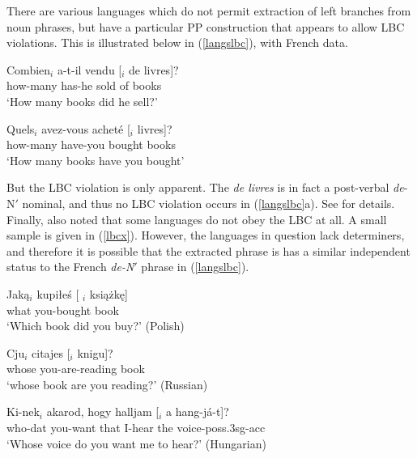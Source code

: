 \documentclass[output=paper
                ,modfonts
                ,nonflat
	        ,collection
	        ,collectionchapter
	        ,collectiontoclongg
 	        ,biblatex
                ,babelshorthands
                ,newtxmath
                ,draftmode
                ,colorlinks, citecolor=brown
]{./langsci/langscibook}
\begin{document}
There are various  languages  which do not permit extraction of left branches from noun phrases, 
but have a particular PP construction that appears to allow LBC violations.
This is illustrated below in (\ref{langslbc}), with French data. 

\eal
\ex \gll Combien$_i$  a-t-il  vendu  [\spc$_i$  de  livres]?\\
how-many  has-he  sold {} of  books\\
\glt `How many books did he sell?'

\ex \gll Quels$_i$  avez-vous  achet\'{e}  [\spc$_i$  livres]?\\
how-many  have-you  bought {}  books\\
\glt `How many books have you bought' 


 \zl \label{langslbc}


\noindent
But the LBC violation is only apparent. The {\it de livres} is in fact a post-verbal {\it de}-N$'$ nominal, and thus no LBC violation occurs  in (\ref{langslbc}a). See \citet{Abeille:Bonami:ea:04} for details.
Finally, \citet{Ross67} also  noted that some languages do not obey the LBC at all. A small sample is given in (\ref{lbcx}). However, the languages  in question lack determiners, and therefore it is possible that
the extracted phrase is has a similar independent status to the French {\it de-N}$'$ phrase in (\ref{langslbc}).
 
\ea
 \ea \gll Jak\k{a}$_i$  kupi\l{}e\'{s} { [ \spc$_i$ } ksi\k{a}\.{z}k\k{e}]\\
     what  you-bought  {} book\\
    \glt `Which book did you buy?' \hfill (Polish)
       
 \ex \gll Cju$_i$  citajes [\spc$_i$  knigu]?\\
 whose  you-are-reading {}  book\\
  \glt `whose book are you reading?' \hfill (Russian)
 
 \ex \gll Ki-nek$_i$  akarod,  hogy  halljam  {[\spc$_i$}  a  hang-j\'{a}-t]?\\
 who-{\sc dat}  you-want  that  I-hear {} the  voice-{\sc poss.3sg-acc}\\ 
\glt `Whose voice do you want me to hear?' \hfill (Hungarian)
 \z \label{lbcx}
 \z
 
\end{document}
